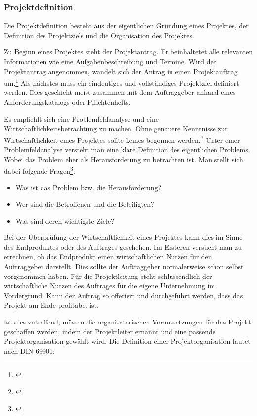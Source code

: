\subsubsection{Projektdefinition}
Die Projektdefinition besteht aus der eigentlichen Gründung eines Projektes,
der Definition des Projektziels und die Organisation des Projektes.

Zu Beginn eines Projektes steht der Projektantrag. Er beinhaltetet alle relevanten
Informationen wie eine Aufgabenbeschreibung und Termine. Wird der Projektantrag
angenommen, wandelt sich der Antrag in einen Projektauftrag um.\footnote{\citealp*[Vgl.][S. 13]{burghardt2007einfuehrung}}
Als nächstes muss ein eindeutiges und vollständiges Projektziel definiert werden.
Dies geschieht meist zusammen mit dem Auftraggeber anhand eines Anforderungskatalogs
oder Pflichtenhefts.

Es empfiehlt sich eine Problemfeldanalyse und eine Wirtschaftlichkeitsbetrachtung
zu machen. Ohne genauere Kenntnisse zur Wirtschaftlichkeit eines Projektes sollte
keines begonnen werden.\footnote{\citealp*[Vgl.][S. 45]{burghardt2007einfuehrung}}
Unter einer Problemfeldanalyse versteht man eine klare Definition des eigentlichen
Problems. Wobei das Problem eher als Herausforderung zu betrachten ist. Man
stellt sich dabei folgende Fragen\footnote{\citealp*[Vgl.][S. 4]{prueter2007multi}}:

\begin{itemize}
    \item Was ist das Problem bzw. die Herausforderung?
    \item Wer sind die Betroffenen und die Beteiligten?
    \item Was sind deren wichtigste Ziele?
\end{itemize}

Bei der Überprüfung der Wirtschaftlichkeit eines Projektes kann dies im Sinne
des Endproduktes oder des Auftrages geschehen. Im Ersteren versucht man zu
errechnen, ob das Endprodukt einen wirtschaftlichen Nutzen für den Auftraggeber
darstellt. Dies sollte der Auftraggeber normalerweise schon selbst vorgenommen
haben. Für die Projektleitung steht schlussendlich der wirtschaftliche Nutzen
des Auftrages für die eigene Unternehmung im Vordergrund. Kann der Auftrag so
offeriert und durchgeführt werden, dass das Projekt am Ende profitabel ist.

Ist dies zutreffend, müssen die organisatorischen Voraussetzungen für das Projekt geschaffen werden,
indem der Projektleiter ernannt und eine passende Projektorganisation gewählt wird.
Die Definition einer Projektorganisation lautet nach DIN 69901:

